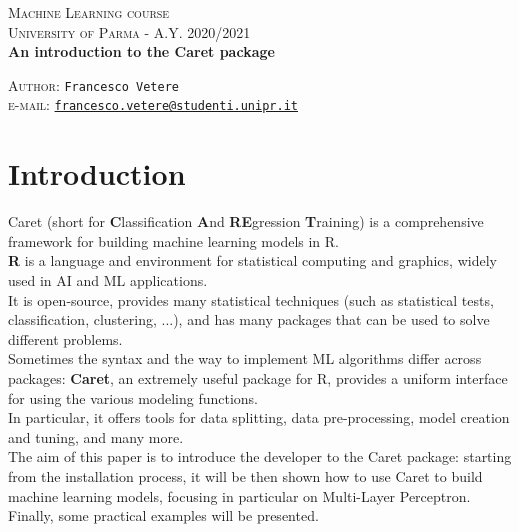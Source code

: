 \documentclass{article}
\date{}
\begin{document}
\begin{titlepage}
  \begin{center}
     \Large\textsc{Machine Learning course\\University of Parma - A.Y. 2020/2021}\\
     \vspace{1cm}
     \Large\textbf{An introduction to the Caret package}\\
     \vspace{1cm}
     
      \large{\textsc{Author}: \texttt{Francesco Vetere}\\ \small \textsc{e-mail:} \href{mailto:francesco.vetere@studenti.unipr.it}{\texttt{francesco.vetere@studenti.unipr.it}} }
  \end{center}
\end{titlepage}



\section{Introduction}
Caret (short for \textbf{C}lassification \textbf{A}nd \textbf{RE}gression \textbf{T}raining) is a comprehensive framework for building machine learning models in R.\\

\textbf{R} is a language and environment for statistical computing and graphics, widely used in AI and ML applications.\\
It is open-source, provides many statistical techniques (such as statistical tests, classification, clustering, ...), and has many packages that can be used to solve different problems.\\

Sometimes the syntax and the way to implement ML algorithms differ across packages: \textbf{Caret}, an extremely useful package for R, provides a uniform interface for using the various modeling functions.\\
In particular, it offers tools for data splitting, data pre-processing, model creation and tuning, and many more.\\

The aim of this paper is to introduce the developer to the Caret package: starting from the installation process, it will be then shown how to use Caret to build machine learning models, focusing in particular on Multi-Layer Perceptron.\\
Finally, some practical examples will be presented.\\
\end{document}
